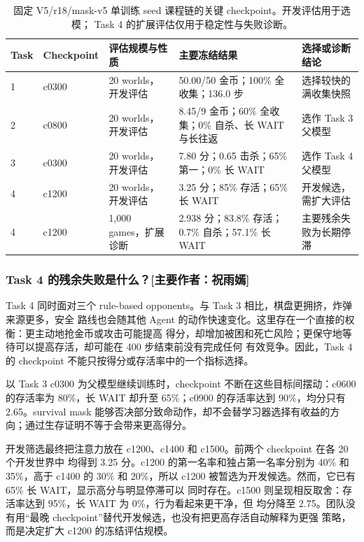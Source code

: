 \documentclass[UTF8,11pt,a4paper,fontset=none]{ctexart}
\newcommand{\primaryauthor}[1]{\texorpdfstring{\enspace\normalfont\small[主要作者：#1]}{ [主要作者：#1]}}
\newcommand{\authorsubsubsection}[2]{\subsubsection{#1\primaryauthor{#2}}}
\begin{document}
\begin{table}[H]
  \centering
  \small
  \caption{固定 V5/r18/mask-v5 单训练 seed 课程链的关键 checkpoint。开发评估用于选模；
  Task 4 的扩展评估仅用于稳定性与失败诊断。}
  \label{tab:rainbow-lite-checkpoints}
  \begin{tabularx}{\textwidth}{@{}l l l X X@{}}
    \toprule
    Task & Checkpoint & 评估规模与性质 & 主要冻结结果 & 选择或诊断结论 \\
    \midrule
    1 & c0300 & 20 worlds，开发评估 & 50.00/50 金币；100\% 全收集；136.0 步 & 选择较快的满收集快照 \\
    2 & c0800 & 20 worlds，开发评估 & 8.45/9 金币；60\% 全收集；0\% 自杀、长 WAIT 与长往返 & 选作 Task 3 父模型 \\
    3 & c0300 & 20 worlds，开发评估 & 7.80 分；0.65 击杀；65\% 第一；0\% 长 WAIT & 选作 Task 4 父模型 \\
    4 & c1200 & 20 worlds，开发评估 & 3.25 分；85\% 存活；65\% 长 WAIT & 开发候选，需扩大评估 \\
    4 & c1200 & 1,000 games，扩展诊断 & 2.938 分；83.8\% 存活；0.7\% 自杀；57.1\% 长 WAIT & 主要残余失败为长期停滞 \\
    \bottomrule
  \end{tabularx}
\end{table}

\authorsubsubsection{Task 4 的残余失败是什么？}{祝雨嫣}

Task 4 同时面对三个 rule-based opponents。与 Task 3 相比，棋盘更拥挤，炸弹来源更多，安全
路线也会随其他 Agent 的动作快速变化。这里存在一个直接的权衡：更主动地抢金币或攻击可能提高
得分，却增加被困和死亡风险；更保守地等待可以提高存活，却可能在 400 步结束前没有完成任何
有效竞争。因此，Task 4 的 checkpoint 不能只按得分或存活率中的一个指标选择。

以 Task 3 c0300 为父模型继续训练时，checkpoint 不断在这些目标间摆动：c0600 的存活率为
80\%，长 WAIT 却升至 65\%；c0900 的存活率达到 90\%，均分只有 2.65。survival mask
能够否决部分致命动作，却不会替学习器选择有收益的方向；通过生存证明不等于会带来更高得分。

开发筛选最终把注意力放在 c1200、c1400 和 c1500。前两个 checkpoint 在各 20 个开发世界中
均得到 3.25 分。c1200 的第一名率和独占第一名率分别为 40\% 和 35\%，高于 c1400 的 30\%
和 20\%，所以 c1200 被暂选为开发候选。然而，它已有 65\% 长 WAIT，显示高分与明显停滞可以
同时存在。c1500 则呈现相反取舍：存活率达到 95\%，长 WAIT 为 0\%，行为看起来更干净，但
均分降至 2.75。团队没有用“最晚 checkpoint”替代开发候选，也没有把更高存活自动解释为更强
策略，而是决定扩大 c1200 的冻结评估规模。
\end{document}
